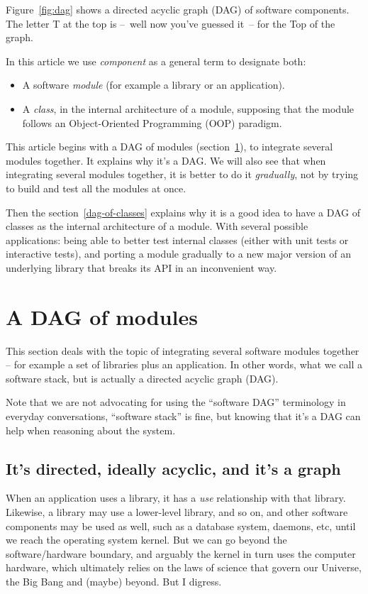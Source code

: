 \documentclass[a4paper,11pt]{article}
\begin{document}
Figure~\ref{fig:dag} shows a directed acyclic graph (DAG) of software components. The letter T at the top is --~well now you've guessed it~-- for the Top of the graph.

In this article we use \emph{component} as a general term to designate both:
\begin{itemize}
  \item A software \emph{module} (for example a library or an application).
  \item A \emph{class}, in the internal architecture of a module, supposing that the module follows an Object-Oriented Programming (OOP) paradigm.
\end{itemize}

This article begins with a DAG of modules (section~\ref{dag-of-modules}), to integrate several modules together. It explains why it's a DAG. We will also see that when integrating several modules together, it is better to do it \emph{gradually}, not by trying to build and test all the modules at once.

Then the section~\ref{dag-of-classes} explains why it is a good idea to have a DAG of classes as the internal architecture of a module. With several possible applications: being able to better test internal classes (either with unit tests or interactive tests), and porting a module gradually to a new major version of an underlying library that breaks its API in an inconvenient way.

\section{A DAG of modules}
\label{dag-of-modules}

This section deals with the topic of integrating several software modules together -- for example a set of libraries plus an application. In other words, what we call a software stack, but is actually a directed acyclic graph (DAG).

Note that we are not advocating for using the ``software DAG'' terminology in everyday conversations, ``software stack'' is fine, but knowing that it's a DAG can help when reasoning about the system.

\subsection{It's directed, ideally acyclic, and it's a graph}
When an application uses a library, it has a \emph{use} relationship with that library. Likewise, a library may use a lower-level library, and so on, and other software components may be used as well, such as a database system, daemons, etc, until we reach the operating system kernel. But we can go beyond the software/hardware boundary, and arguably the kernel in turn uses the computer hardware, which ultimately relies on the laws of science that govern our Universe, the Big Bang and (maybe) beyond. But I digress.
\end{document}
